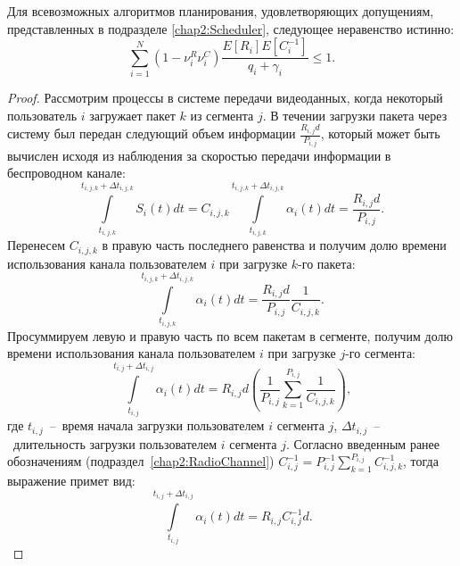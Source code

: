 \begin{lemma}
\label{lem:GeneralConstrain}
Для всевозможных алгоритмов планирования, удовлетворяющих допущениям, представленных в подразделе \ref{chap2:Scheduler}, следующее неравенство истинно:
\emph{
\begin{equation}
	\label{eq:GeneralConstrain}
	\sum\limits_{i=1}^{N} {\left(1-\nu^R_i\nu^C_i\right)\frac{E[R_i]E[C_i^{-1}]}{q_i + \gamma_i}} \leq 1.
\end{equation}
}
\end{lemma}

\begin{proof}
Рассмотрим процессы в системе передачи видеоданных, когда некоторый пользователь $i$ загружает пакет $k$ из сегмента $j$. В течении загрузки пакета через систему был передан следующий объем информации $\frac{R_{i,j} d }{P_{i,j}}$, который может быть вычислен исходя из наблюдения за скоростью передачи информации в беспроводном канале:
\begin{equation}
	\nonumber
	\int\limits_{t_{i,j,k}}^{t_{i,j,k} + \Delta t_{i,j,k}} S_i(t) dt = C_{i,j,k} \int\limits_{t_{i,j,k}}^{t_{i,j,k} + \Delta t_{i,j,k}}\alpha_i(t) dt = \frac{R_{i,j} d }{P_{i,j}}.
\end{equation}
Перенесем $C_{i,j,k}$ в правую часть последнего равенства и получим долю времени использования канала пользователем $i$ при загрузке $k$-го пакета:
\begin{equation}
	\nonumber
	\int\limits_{t_{i,j,k}}^{t_{i,j,k} + \Delta t_{i,j,k}}\alpha_i(t) dt = \frac{R_{i,j} d }{P_{i,j}}\frac{1}{C_{i,j,k}}.
\end{equation}
Просуммируем левую и правую часть по всем пакетам в сегменте, получим долю времени использования канала пользователем $i$ при загрузке $j$-го сегмента:
\begin{equation}
	\nonumber
	\int\limits_{t_{i,j}}^{t_{i,j} + \Delta t_{i,j}}\alpha_i(t) dt = R_{i,j} d\left( \frac{1}{P_{i,j}}\sum\limits_{k=1}^{P_{i,j}} \frac{1}{C_{i,j,k}}\right),
\end{equation}
где $t_{i,j}$~--~время начала загрузки пользователем $i$ сегмента $j$, $\Delta t_{i,j}$~--~длительность загрузки пользователем $i$ сегмента $j$. Согласно введенным ранее обозначениям (подраздел~\ref{chap2:RadioChannel}) $C_{i,j}^{-1} = P_{i,j}^{-1}\sum\limits_{k=1}^{P_{i,j}} C_{i,j,k}^{-1}$, тогда выражение примет вид:
\begin{equation}
	\nonumber
	\int\limits_{t_{i,j}}^{t_{i,j} + \Delta t_{i,j}}\alpha_i(t) dt = R_{i,j}C_{i,j}^{-1} d.
\end{equation}


\end{proof}
